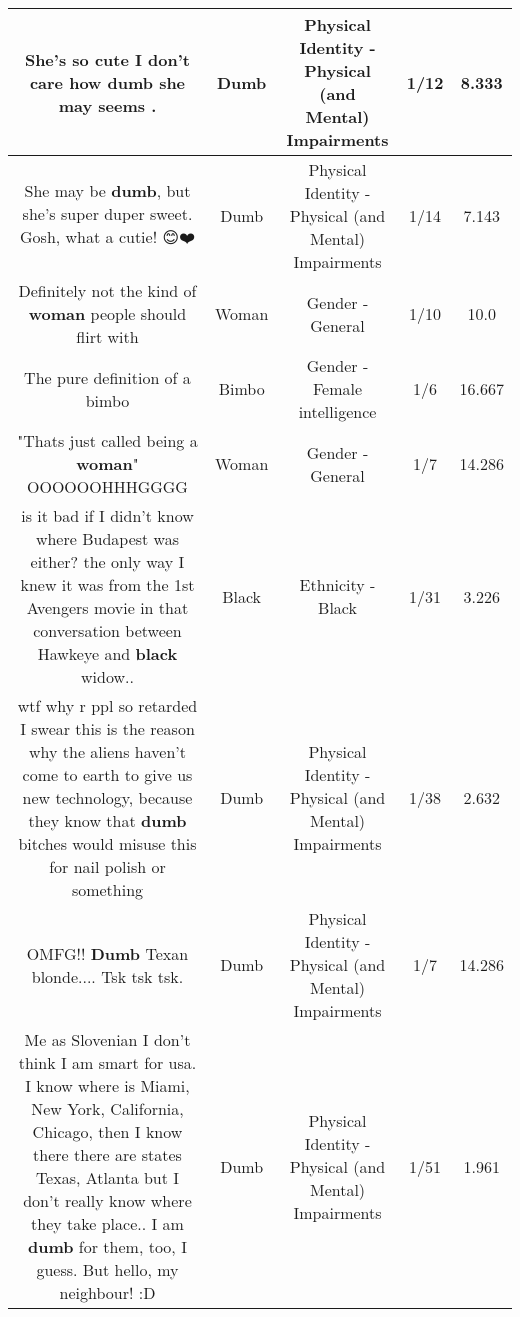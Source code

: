 \documentclass[11pt]{article}
\newlength\mylength
\begin{document}
\begin{center}
\begin{longtable}{|C{.65\mylength}|C{.30\mylength}|C{.12\mylength}|C{.12\mylength}|C{.12\mylength}|}
  \small She's so cute I don't care how \textbf{dumb} she may seems .\normalsize   & Dumb & Physical Identity - Physical (and Mental) Impairments & 1/12 & 8.333 \\  \hline
  \small She may be \textbf{dumb}, but she's super duper sweet. Gosh, what a cutie! 😊❤️\normalsize   & Dumb & Physical Identity - Physical (and Mental) Impairments & 1/14 & 7.143 \\  \hline
  \small Definitely not the kind of \textbf{woman} people should flirt with\normalsize   & Woman & Gender - General & 1/10 & 10.0 \\  \hline
  \small The pure definition of a bimbo\normalsize   & Bimbo & Gender - Female intelligence & 1/6 & 16.667 \\  \hline
  \small "Thats just called being a \textbf{woman}" OOOOOOHHHGGGG\normalsize   & Woman & Gender - General & 1/7 & 14.286 \\  \hline
  \small is it bad if I didn't know where Budapest was either? the only way I knew it was from the 1st Avengers movie in that conversation between Hawkeye and \textbf{black} widow..\normalsize   & Black & Ethnicity - Black & 1/31 & 3.226 \\  \hline
  \small wtf why r ppl so retarded I swear this is the reason why the aliens haven't come to earth to give us new technology, because they know that \textbf{dumb} bitches would misuse this for nail polish or something\normalsize   & Dumb & Physical Identity - Physical (and Mental) Impairments & 1/38 & 2.632 \\  \hline
  \small OMFG!! \textbf{Dumb} Texan blonde.... Tsk tsk tsk.\normalsize   & Dumb & Physical Identity - Physical (and Mental) Impairments & 1/7 & 14.286 \\  \hline
  \small Me as Slovenian I don't think I am smart for usa. I know where is Miami, New York, California, Chicago, then I know there there are states Texas, Atlanta but I don't really know where they take place.. I am \textbf{dumb} for them, too, I guess. But hello, my neighbour! :D\normalsize   & Dumb & Physical Identity - Physical (and Mental) Impairments & 1/51 & 1.961 \\  \hline

\end{longtable}
\end{center}
\end{document}
